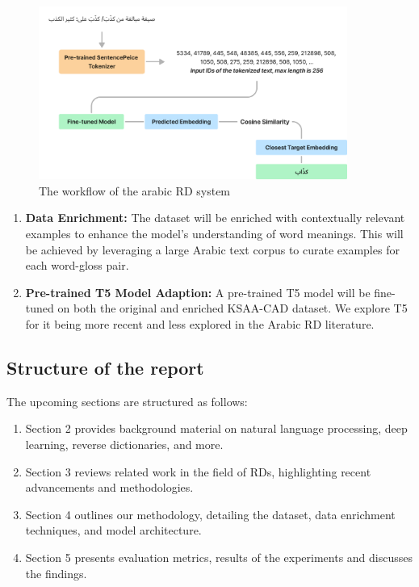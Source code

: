 \documentclass[12pt]{article}
\begin{document}
\begin{figure}
    \centering
    \captionsetup{justification=centering}
    \includegraphics[width=0.9\textwidth]{rd-flow.png}
    \caption{The workflow of the arabic RD system}
    \label{fig:rd-flow}
\end{figure}

\begin{enumerate}
    \item \textbf{Data Enrichment:} The dataset will be enriched with contextually relevant examples to enhance the model's understanding of word meanings. This will be achieved by leveraging a large Arabic text corpus to curate examples for each word-gloss pair.
    \item \textbf{Pre-trained T5 Model Adaption:} A pre-trained T5 model \cite{Linting2021} will be fine-tuned on both the original and enriched KSAA-CAD dataset. We explore T5 for it being more recent and less explored in the Arabic RD literature.
\end{enumerate}

\subsection{Structure of the report}

The upcoming sections are structured as follows:

\begin{enumerate}
    \item Section 2 provides background material on natural language processing, deep learning, reverse dictionaries, and more.
    \item Section 3 reviews related work in the field of RDs, highlighting recent advancements and methodologies.
    \item Section 4 outlines our methodology, detailing the dataset, data enrichment techniques, and model architecture.
    \item Section 5 presents evaluation metrics, results of the experiments and discusses the findings.
\end{enumerate}
\end{document}
